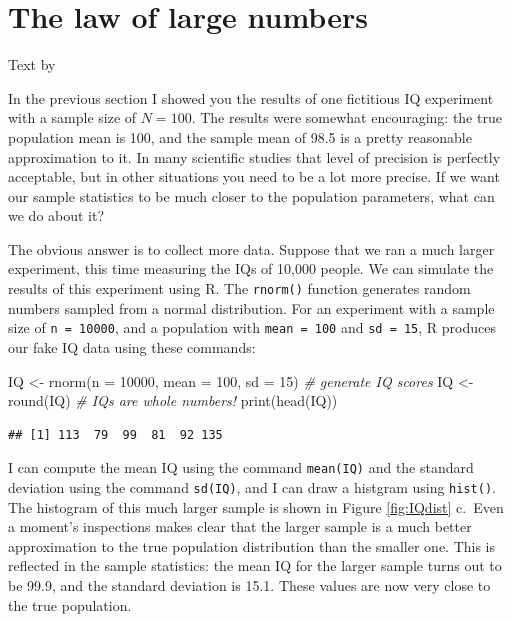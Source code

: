 \documentclass[
]{book}
\newenvironment{Shaded}{\begin{snugshade}}{\end{snugshade}}
\newcommand{\AttributeTok}[1]{\textcolor[rgb]{0.77,0.63,0.00}{#1}}
\newcommand{\CommentTok}[1]{\textcolor[rgb]{0.56,0.35,0.01}{\textit{#1}}}
\newcommand{\DecValTok}[1]{\textcolor[rgb]{0.00,0.00,0.81}{#1}}
\newcommand{\FunctionTok}[1]{\textcolor[rgb]{0.00,0.00,0.00}{#1}}
\newcommand{\NormalTok}[1]{#1}
\newcommand{\OtherTok}[1]{\textcolor[rgb]{0.56,0.35,0.01}{#1}}
\begin{document}
\hypertarget{lawlargenumbers}{%
\section{The law of large numbers}\label{lawlargenumbers}}

Text by \citet{Navarro2018}

In the previous section I showed you the results of one fictitious IQ experiment with a sample size of \(N=100\). The results were somewhat encouraging: the true population mean is 100, and the sample mean of 98.5 is a pretty reasonable approximation to it. In many scientific studies that level of precision is perfectly acceptable, but in other situations you need to be a lot more precise. If we want our sample statistics to be much closer to the population parameters, what can we do about it?

The obvious answer is to collect more data. Suppose that we ran a much larger experiment, this time measuring the IQs of 10,000 people. We can simulate the results of this experiment using R. The \texttt{rnorm()} function generates random numbers sampled from a normal distribution. For an experiment with a sample size of \texttt{n\ =\ 10000}, and a population with \texttt{mean\ =\ 100} and \texttt{sd\ =\ 15}, R produces our fake IQ data using these commands:

\begin{Shaded}
\begin{Highlighting}[]
\NormalTok{IQ }\OtherTok{\textless{}{-}} \FunctionTok{rnorm}\NormalTok{(}\AttributeTok{n =} \DecValTok{10000}\NormalTok{, }\AttributeTok{mean =} \DecValTok{100}\NormalTok{, }\AttributeTok{sd =} \DecValTok{15}\NormalTok{) }\CommentTok{\# generate IQ scores}
\NormalTok{IQ }\OtherTok{\textless{}{-}} \FunctionTok{round}\NormalTok{(IQ) }\CommentTok{\# IQs are whole numbers!}
\FunctionTok{print}\NormalTok{(}\FunctionTok{head}\NormalTok{(IQ))}
\end{Highlighting}
\end{Shaded}

\begin{verbatim}
## [1] 113  79  99  81  92 135
\end{verbatim}

I can compute the mean IQ using the command \texttt{mean(IQ)} and the standard deviation using the command \texttt{sd(IQ)}, and I can draw a histgram using \texttt{hist()}. The histogram of this much larger sample is shown in Figure \ref{fig:IQdist} c.~Even a moment's inspections makes clear that the larger sample is a much better approximation to the true population distribution than the smaller one. This is reflected in the sample statistics: the mean IQ for the larger sample turns out to be 99.9, and the standard deviation is 15.1. These values are now very close to the true population.
\end{document}
